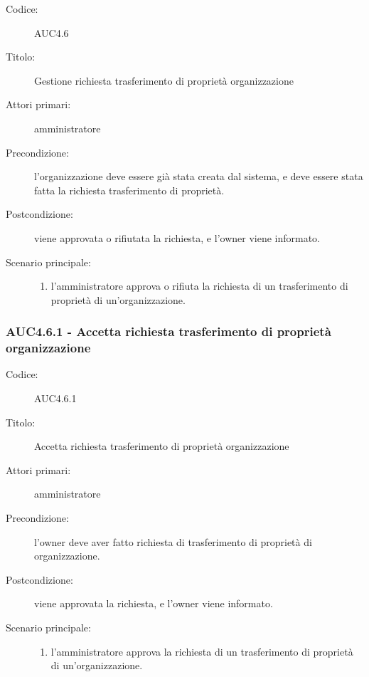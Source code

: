 \documentclass[casi-duso]{subfiles}
\begin{document}
\begin{description}
  \item[Codice:] AUC4.6
  \item[Titolo:] Gestione richiesta trasferimento di proprietà organizzazione
  \item[Attori primari:] amministratore
  \item[Precondizione:] l'organizzazione deve essere già stata creata dal sistema, e deve essere stata fatta la richiesta trasferimento di proprietà.
  \item[Postcondizione:] viene approvata o rifiutata la richiesta, e l'owner viene informato.
  \item[Scenario principale:]
  \begin{enumerate}
    \item l'amministratore approva o rifiuta la richiesta di un trasferimento di proprietà di un'organizzazione.
  \end{enumerate}
\end{description}


\subsubsection{AUC4.6.1 - Accetta richiesta trasferimento di proprietà organizzazione}%
\label{subsub:AUC4.6.1}
\begin{description}
  \item[Codice:] AUC4.6.1
  \item[Titolo:] Accetta richiesta trasferimento di proprietà organizzazione
  \item[Attori primari:] amministratore
  \item[Precondizione:] l'owner deve aver fatto richiesta di trasferimento di proprietà di organizzazione.
  \item[Postcondizione:] viene approvata la richiesta, e l'owner viene informato.
  \item[Scenario principale:]
  \begin{enumerate}
    \item l'amministratore approva la richiesta di un trasferimento di proprietà di un'organizzazione.
  \end{enumerate}
\end{description}
\end{document}
